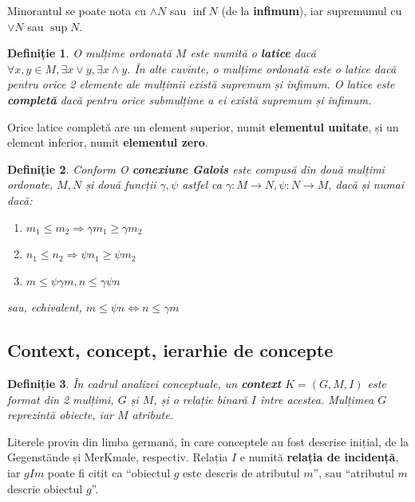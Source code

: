 \documentclass[12pt, a4paper, twoside, romanian]{teza-upb}
\newtheorem{defn}{Definiție}
\begin{document}
    Minorantul se poate nota cu $\wedge N$ sau $\inf N$ (de la \textbf{infimum}), iar supremumul cu $\vee N$ sau $\sup N$.

    \begin{defn}
      O mulțime ordonată $M$ este numită o \textbf{latice} dacă $\forall x,y \in M, \exists x \vee y, \exists x \wedge y$. În alte cuvinte, o mulțime ordonată este o latice dacă pentru orice 2 elemente
      ale mulțimii există supremum și infimum. O latice este \textbf{completă} dacă pentru orice submulțime a ei există supremum și infimum.
    \end{defn}

    Orice latice completă are un element superior, numit \textbf{elementul unitate}, și un element inferior, numit \textbf{elementul zero}.

    \begin{defn}
      Conform \cite{Carpineto:2004:CDA:975252} O \textbf{conexiune Galois} este compusă din două mulțimi ordonate, $M, N$ și două funcții $\gamma, \psi$ astfel ca $ \gamma: M \rightarrow N, \psi : N \rightarrow M$, dacă și numai dacă:
    \begin{enumerate}
      \item $m_1 \le m_2 \Rightarrow  \gamma m_1 \ge \gamma m_2$
      \item $n_1 \le n_2 \Rightarrow \psi n_1 \ge \psi m_2$
      \item $m \le \psi \gamma m,  n \le \gamma\psi n $
    \end{enumerate}
    sau, echivalent, $m \le \psi n \Leftrightarrow n \le \gamma m$
    \end{defn}

    \subsection{Context, concept, ierarhie de concepte}
    \begin{defn}
      În cadrul analizei conceptuale, un \textbf{context} $K = (G, M, I)$ este format din 2 mulțimi, $G$ și $M$, și o relație binară $I$ între acestea. Mulțimea $G$ reprezintă obiecte, iar $M$ atribute.
    \end{defn}

      Literele provin din limba germană, în care conceptele au fost descrise inițial, de la Gegenstände și MerKmale, respectiv. Relația $I$ e numită \textbf{relația de incidență}, iar $gIm$ poate fi citit ca ``obiectul $g$ este descris de atributul $m$'', sau ``atributul $m$ descrie obiectul $g$''.
\end{document}
